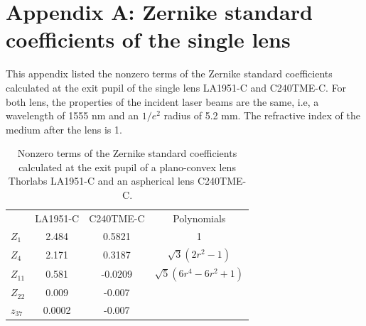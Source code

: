 \documentclass[9pt,twocolumn,twoside]{osajnl}
\begin{document}
\section*{Appendix A: Zernike standard coefficients of the single lens}
\setcounter{table}{0}
\renewcommand{\thetable}{A\arabic{table}}
This appendix listed the nonzero terms of the Zernike standard coefficients calculated at the exit pupil of the single lens LA1951-C and C240TME-C. For both lens, the properties of the incident laser beams are the same, i.e, a wavelength of 1555 nm and an $1/e^2$ radius of 5.2 mm. The refractive index of the medium after the lens is 1.
\begin{table}[h!]
	\centering
	\begin{tabular}[c]{|l|c|c|c|}
		\hline
		\rowcolor{lightgray}
		\rowcolor{gray}
		 & LA1951-C & C240TME-C & Polynomials\\
		$Z_1$ & 2.484 & 0.5821 & 1 \\
		\rowcolor{lightgray}
		$Z_4$ & 2.171 & 0.3187 & $\sqrt{3}(2r^2-1)$ \\
		$Z_{11}$ & 0.581 & -0.0209 & $\sqrt{5}(6r^4-6r^2+1)$ \\
		\rowcolor{lightgray}
		$Z_{22}$ & 0.009 & -0.007 & \vtop{\hbox{\strut $\sqrt{7}(20r^6-30r^4$}\hbox{\strut $+12r^2-1)$}}\\
		$z_{37}$ & 0.0002 & -0.007 & \vtop{\hbox{\strut $\sqrt{9}(70r^8-140r^6$}\hbox{\strut $+90r^4-20r^2+1)$}}\\
		\hline
	\end{tabular}	
	\caption{Nonzero terms of the Zernike standard coefficients calculated at the exit pupil of a plano-convex lens Thorlabs LA1951-C and an aspherical lens C240TME-C.}\label{tab:A1}
\end{table}



\end{document}
